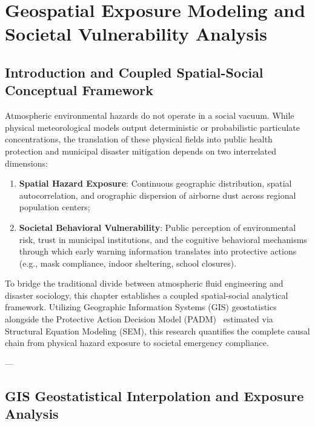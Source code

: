 
\chapter{Geospatial Exposure Modeling and Societal Vulnerability Analysis}
\label{chap:spatial_socioeconomic}

\section{Introduction and Coupled Spatial-Social Conceptual Framework}
\label{sec:spatial_intro}

Atmospheric environmental hazards do not operate in a social vacuum. While physical meteorological models output deterministic or probabilistic particulate concentrations, the translation of these physical fields into public health protection and municipal disaster mitigation depends on two interrelated dimensions:
\begin{enumerate}
    \item \textbf{Spatial Hazard Exposure}: Continuous geographic distribution, spatial autocorrelation, and orographic dispersion of airborne dust across regional population centers;
    \item \textbf{Societal Behavioral Vulnerability}: Public perception of environmental risk, trust in municipal institutions, and the cognitive behavioral mechanisms through which early warning information translates into protective actions (e.g., mask compliance, indoor sheltering, school closures).
\end{enumerate}

To bridge the traditional divide between atmospheric fluid engineering and disaster sociology, this chapter establishes a coupled spatial-social analytical framework. Utilizing Geographic Information Systems (GIS) geostatistics alongside the Protective Action Decision Model (PADM)~\cite{lindell2012protective} estimated via Structural Equation Modeling (SEM), this research quantifies the complete causal chain from physical hazard exposure to societal emergency compliance.

---

\section{GIS Geostatistical Interpolation and Exposure Analysis}
\label{sec:gis_exposure}

